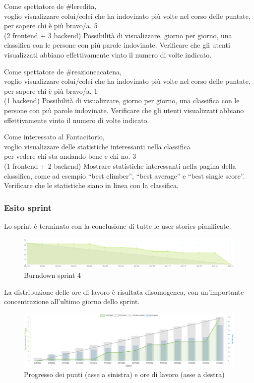 \userstory%
{Come spettatore de \#leredita,\\voglio visualizzare colui/colei che ha indovinato più volte nel corso delle puntate,\\per sapere chi è più bravo/a.}%
{5\\(2 frontend + 3 backend)}%
{Possibilità di visualizzare, giorno per giorno, una classifica con le persone con più parole indovinate.}%
{Verificare che gli utenti visualizzati abbiano effettivamente vinto il numero di volte indicato.}

\userstory%
{Come spettatore de \#reazioneacatena,\\voglio visualizzare colui/colei che ha indovinato più volte nel corso delle puntate,\\per sapere chi è più bravo/a.}%
{1\\(1 backend)}%
{Possibilità di visualizzare, giorno per giorno, una classifica con le persone con più parole indovinate.}%
{Verificare che gli utenti visualizzati abbiano effettivamente vinto il numero di volte indicato.}

\userstory%
{Come interessato al Fantacitorio,\\voglio visualizzare delle statistiche interessanti nella classifica\\per vedere chi sta andando bene e chi no.}%
{3\\(1 frontend + 2 backend)}%
{Mostrare statistiche interessanti nella pagina della classifica, come ad esempio “best climber”, “best average” e “best single score”.}%
{Verificare che le statistiche siano in linea con la classifica.}


\subsubsection{Esito sprint}
Lo sprint è terminato con la conclusione di tutte le user stories pianificate.\\
\begin{figure}[H]
    \centering
    \includegraphics[width=15cm]{./img/sprint4/burndown.png}
    \caption{Burndown sprint 4}
\end{figure}
La distribuzione delle ore di lavoro è risultata disomogenea, con un'importante concentrazione all'ultimo giorno dello sprint.
\begin{figure}[H]
    \centering
    \includegraphics[width=15cm]{./img/sprint4/worktime.png}
    \caption{Progresso dei punti (asse a sinistra) e ore di lavoro (asse a destra)}
\end{figure}


